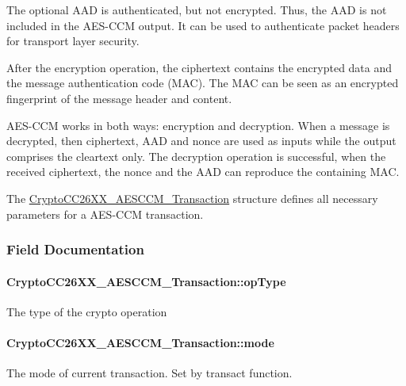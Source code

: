 The optional A\+A\+D is authenticated, but not encrypted. Thus, the A\+A\+D is not included in the A\+E\+S-\/\+C\+C\+M output. It can be used to authenticate packet headers for transport layer security.

After the encryption operation, the ciphertext contains the encrypted data and the message authentication code (M\+A\+C). The M\+A\+C can be seen as an encrypted fingerprint of the message header and content.

A\+E\+S-\/\+C\+C\+M works in both ways\+: encryption and decryption. When a message is decrypted, then ciphertext, A\+A\+D and nonce are used as inputs while the output comprises the cleartext only. The decryption operation is successful, when the received ciphertext, the nonce and the A\+A\+D can reproduce the containing M\+A\+C.

The \hyperlink{struct_crypto_c_c26_x_x___a_e_s_c_c_m___transaction}{Crypto\+C\+C26\+X\+X\+\_\+\+A\+E\+S\+C\+C\+M\+\_\+\+Transaction} structure defines all necessary parameters for a A\+E\+S-\/\+C\+C\+M transaction. 

\subsubsection{Field Documentation}
\paragraph[{op\+Type}]{ Crypto\+C\+C26\+X\+X\+\_\+\+A\+E\+S\+C\+C\+M\+\_\+\+Transaction\+::op\+Type}\label{struct_crypto_c_c26_x_x___a_e_s_c_c_m___transaction_a290d9a7869443690836e17e2540fc369}
The type of the crypto operation 
\paragraph[{mode}]{ Crypto\+C\+C26\+X\+X\+\_\+\+A\+E\+S\+C\+C\+M\+\_\+\+Transaction\+::mode}\label{struct_crypto_c_c26_x_x___a_e_s_c_c_m___transaction_a47c6078be481486d0dda9a9ab2685d0c}
The mode of current transaction. Set by transact function. 
